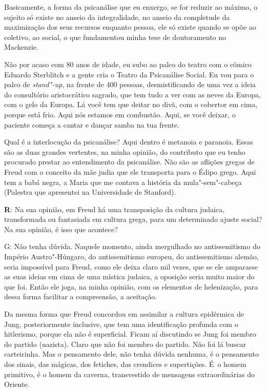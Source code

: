  

Basicamente, a forma da psicanálise que eu enxergo, se for reduzir ao
máximo, o sujeito só existe no anseio da integralidade, no anseio da
completude da maximização dos seus recursos enquanto pessoa, ele só
existe quando se opõe ao coletivo, ao social, o que fundamentou minha
tese de doutoramento no Mackenzie.

 

Não por acaso com 80 anos de idade, eu subo ao palco do teatro com o
cômico Eduardo Sterblitch e a gente cria o Teatro da Psicanálise Social.
Eu vou para o palco de \emph{stand"-up}, na frente de 400 pessoas, desmistificando
de uma vez a ideia do consultório aristocrático sagrado, que tem tudo a
ver com as neves da Europa, com o gelo da Europa. Lá você tem que deitar
no divã, com o cobertor em cima, porque está frio. Aqui nós estamos em
combustão. Aqui, se você deixar, o paciente começa a cantar e dançar
samba na tua frente.

 

Qual é a interlocução da psicanálise? Aqui dentro é metanoia e paranoia.
Essas são as duas grandes vertentes, na minha opinião, do contributo que
eu tenho procurado prestar ao entendimento da psicanálise. Não são as
aflições gregas de Freud com o conceito da mãe judia que ele transporta
para o Édipo grego. Aqui tem a babá negra, a Maria que me contava a
história da mula"-sem"-cabeça (Palestra que apresentei na Universidade de
Stanford).

 

\textbf{R}: Na sua opinião, em Freud há uma transposição da cultura
judaica, transformada ou fantasiada em cultura grega, para um
determinado ajuste social? Na sua opinião, é isso que acontece?

 

G: Não tenha dúvida. Naquele momento, ainda mergulhado no antissemitismo
do Império Austro"-Húngaro, do antissemitismo europeu, do antissemitismo
alemão, seria impossível para Freud, como ele deixa claro mil vezes, que
se ele amparasse as suas ideias em cima de uma mística judaica, a oposição seria muito maior do que foi. Então ele joga, na minha opinião,
com os elementos de helenização, para dessa forma facilitar a
compreensão, a aceitação.

 

Da mesma forma que Freud concordou em assimilar a cultura epidérmica de
Jung, posteriormente inclusive, que tem uma identificação profunda com o
hitlerismo, porque ela não é superficial. Ficam aí discutindo se Jung
foi membro do partido (nazista). Claro que não foi membro do partido.
Não foi lá buscar carteirinha. Mas o pensamento dele, não tenha dúvida
nenhuma, é o pensamento dos sinais, das mágicas, dos fetiches, das
crendices e supertições. É~o homem primitivo, é o homem da caverna,
transvestido de mensagens extraordinárias do Oriente.

